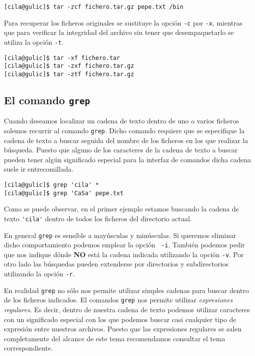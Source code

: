 \begin{verbatim}
[cila@gulic]$ tar -zcf fichero.tar.gz pepe.txt /bin
\end{verbatim}

Para recuperar los ficheros originales se sustituye la opción {\tt -c}
por {\tt  -x}, mientras que  para verificar la integridad  del archivo
sin tener que desempaquetarlo se utiliza la opción {\tt -t}.

\begin{verbatim}
[cila@gulic]$ tar -xf fichero.tar
[cila@gulic]$ tar -zxf fichero.tar.gz
[cila@gulic]$ tar -ztf fichero.tar.gz
\end{verbatim}

\subsection{El comando {\tt grep}}

Cuando deseamos  localizar un cadena de  texto dentro de uno  o varios
ficheros  solemos  recurrir  al  comando  {\tt  grep}.  Dicho  comando
requiere que  se especifique la cadena  de texto a buscar  seguida del
nombre de  los ficheros en  los que  realizar la búsqueda.  Puesto que
alguno de los  caracteres de la cadena de texto  a buscar pueden tener
algún significado especial  para la interfaz de  comandos dicha cadena
suele ir entrecomillada.

\begin{verbatim}
[cila@gulic]$ grep 'cila' *
[cila@gulic]$ grep 'CaSa' pepe.txt
\end{verbatim}

Como  se puede  observar, en  el  primer ejemplo  estamos buscando  la
cadena  de  texto \verb|'cila'|  dentro  de  todos los  ficheros  del
directorio actual.

En  general {\tt  grep}  es  sensible a  mayúsculas  y minúsculas.  Si
queremos eliminar dicho comportamiento  podemos emplear la opción {\tt
-i}.  También  podemos pedir  que  nos  indique  dónde {\bf  NO}  está
la  cadena indicada  utilizando  la  opción {\tt  -v}.  Por otro  lado
las  búsquedas  pueden  extenderse por  directorios  y  subdirectorios
utilizando la opción {\tt -r}.

En realidad  {\tt grep} no  sólo nos permite utilizar  simples cadenas
para buscar dentro  de los ficheros indicados. El  comandos {\tt grep}
nos permite utilizar {\em expresiones  regulares}. Es decir, dentro de
nuestra cadena de texto podemos utilizar caracteres con un significado
especial con los  que podemos buscar casi cualquier  tipo de expresión
entre nuestros archivos. Puesto que las expresiones regulares se salen
completamente  del  alcance de  este  tema  recomendamos consultar  el
tema correspondiente.

